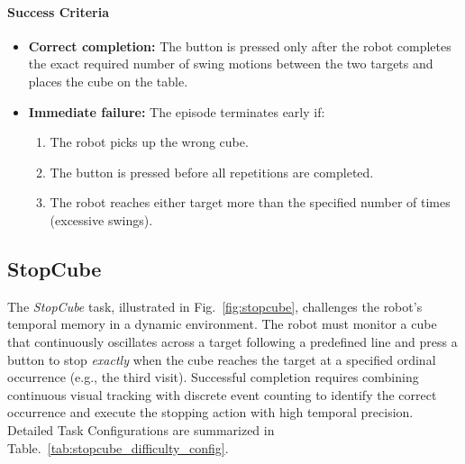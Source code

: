 \paragraph{Success Criteria}
\begin{itemize}[itemsep=1pt, topsep=0pt, leftmargin=*]
    \item \textbf{Correct completion:} The button is pressed only after the robot completes the exact required number of swing motions between the two targets and places the cube on the table.
        
    \item \textbf{Immediate failure:} The episode terminates early if:
    \begin{enumerate}[itemsep=1pt, topsep=0pt, leftmargin=*]
        \item The robot picks up the wrong cube.
        \item The button is pressed before all repetitions are completed.
        \item The robot reaches either target more than the specified number of times (excessive swings).
    \end{enumerate}
\end{itemize}
\clearpage



\subsection{StopCube}
\label{sec:task_stopcube}


\begin{table}
    \centering
    \caption{\textit{StopCube} Task Configuration.}
    \label{tab:stopcube_difficulty_config}
    \renewcommand{\arraystretch}{1.2}
   {}
\end{table}


The \textit{StopCube} task, illustrated in Fig.~\ref{fig:stopcube}, challenges the robot’s temporal memory in a dynamic environment. The robot must monitor a cube that continuously oscillates across a target following a predefined line and press a button to stop \textit{exactly} when the cube reaches the target at a specified ordinal occurrence (e.g., the third visit). Successful completion requires combining continuous visual tracking with discrete event counting to identify the correct occurrence and execute the stopping action with high temporal precision.
Detailed Task Configurations are summarized in Table.~\ref{tab:stopcube_difficulty_config}.

